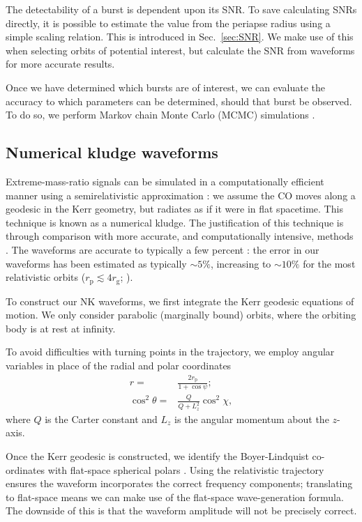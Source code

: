 \documentclass[useAMS,usedcolumn,usegraphicx,usenatbib]{mn2e}
\newcommand{\secref}[1]{Sec.~\ref{sec:#1}}
\newcommand{\sub}[1]{\ensuremath{_\mathrm{#1}}}
\begin{document}
The detectability of a burst is dependent upon its SNR. To save calculating SNRs directly, it is possible to estimate the value from the periapse radius using a simple scaling relation. This is introduced in \secref{SNR}. We make use of this when selecting orbits of potential interest, but calculate the SNR from waveforms for more accurate results.

Once we have determined which bursts are of interest, we can evaluate the accuracy to which parameters can be determined, should that burst be observed. To do so, we perform Markov chain Monte Carlo (MCMC) simulations \citep[chapter 29]{MacKay2003}.

\subsection{Numerical kludge waveforms}\label{sec:NK}

Extreme-mass-ratio signals can be simulated in a computationally efficient manner using a semirelativistic approximation \citep{Ruffini1981}: we assume the CO moves along a geodesic in the Kerr geometry, but radiates as if it were in flat spacetime. This technique is known as a numerical kludge. The justification of this technique is through comparison with more accurate, and computationally intensive, methods \citep{Gair2005, Babak2007}. The waveforms are accurate to typically a few percent \citep{Tanaka1993,Gair2005}: the error in our waveforms has been estimated as typically $\sim 5\%$, increasing to $\sim 10\%$ for the most relativistic orbits ($r\sub{p} \lesssim 4 r\sub{g}$; \citealt{Berry2013}).

To construct our NK waveforms, we first integrate the Kerr geodesic equations of motion. We only consider parabolic (marginally bound) orbits, where the orbiting body is at rest at infinity.

To avoid difficulties with turning points in the trajectory, we employ angular variables in place of the radial and polar coordinates \citep{Drasco2004}
\begin{align}
r = {} & \frac{2 r\sub{p}}{1 + \cos\psi};\\
\cos^2\theta = {} & \frac{Q}{Q+L_z^2}\cos^2\chi,
\end{align}
where $Q$ is the Carter constant and $L_z$ is the angular momentum about the $z$-axis.

Once the Kerr geodesic is constructed, we identify the Boyer-Lindquist co-ordinates with flat-space spherical polars \citep{Gair2005, Babak2007}. Using the relativistic trajectory ensures the waveform incorporates the correct frequency components; translating to flat-space means we can make use of the flat-space wave-generation formula. The downside of this is that the waveform amplitude will not be precisely correct.
\end{document}

